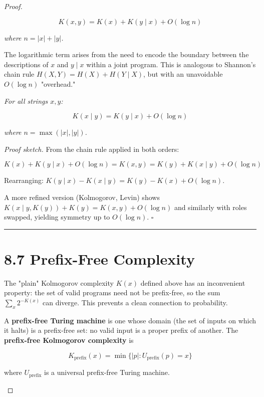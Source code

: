 \begin{proof}
\begin{theorem}
\[
K(x, y) = K(x) + K(y \mid x) + O(\log n)
\]

\textit{where $n = |x| + |y|$.}

The logarithmic term arises from the need to encode the boundary between the descriptions of $x$ and $y \mid x$ within a joint program. This is analogous to Shannon's chain rule $H(X, Y) = H(X) + H(Y \mid X)$, but with an unavoidable $O(\log n)$ "overhead."
\end{theorem}

\begin{theorem}
\textit{For all strings $x, y$:}

\[
K(x \mid y) = K(y \mid x) + O(\log n)
\]

\textit{where $n = \max(|x|, |y|)$.}

\textit{Proof sketch.} From the chain rule applied in both orders:

\[
K(x) + K(y \mid x) + O(\log n) = K(x, y) = K(y) + K(x \mid y) + O(\log n)
\]

Rearranging: $K(y \mid x) - K(x \mid y) = K(y) - K(x) + O(\log n)$.

A more refined version (Kolmogorov, Levin) shows $K(x \mid y, K(y)) + K(y) = K(x, y) + O(\log n)$ and similarly with roles swapped, yielding symmetry up to $O(\log n)$. $\square$

\bigskip\hrule\bigskip
\end{theorem}

\section{8.7 Prefix-Free Complexity}

The "plain" Kolmogorov complexity $K(x)$ defined above has an inconvenient property: the set of valid programs need not be prefix-free, so the sum $\sum_x 2^{-K(x)}$ can diverge. This prevents a clean connection to probability.

\begin{definition}
A \textbf{prefix-free Turing machine} is one whose domain (the set of inputs on which it halts) is a prefix-free set: no valid input is a proper prefix of another. The \textbf{prefix-free Kolmogorov complexity} is

\[
K_{\text{prefix}}(x) = \min\{ |p| : U_{\text{prefix}}(p) = x\} 
\]

where $U_{\text{prefix}}$ is a universal prefix-free Turing machine.
\end{definition}


\end{proof}
